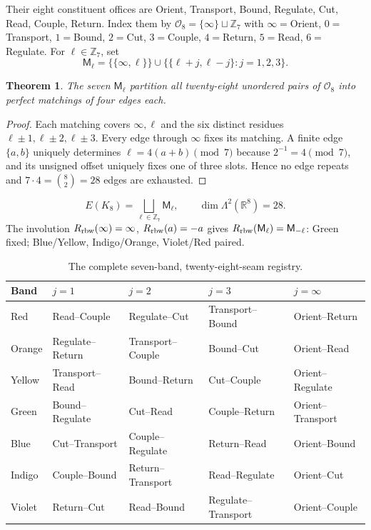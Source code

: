 \documentclass[10pt]{article}
\newtheorem{theorem}{Theorem}
\newcommand{\R}{\mathbb R}
\newcommand{\Z}{\mathbb Z}
\begin{document}
Their eight constituent offices are Orient, Transport, Bound, Regulate, Cut, Read, Couple, Return. Index them by $\mathcal O_8=\{\infty\}\sqcup\Z_7$ with $\infty=$Orient, $0=$Transport, $1=$Bound, $2=$Cut, $3=$Couple, $4=$Return, $5=$Read, $6=$Regulate. For $\ell\in\Z_7$, set
\begin{equation}\mathsf M_\ell=\{\{\infty,\ell\}\}\cup\{\{\ell+j,\ell-j\}:j=1,2,3\}.\end{equation}
\begin{theorem}The seven $\mathsf M_\ell$ partition all twenty-eight unordered pairs of $\mathcal O_8$ into perfect matchings of four edges each.\end{theorem}
\begin{proof}Each matching covers $\infty,\ell$ and the six distinct residues $\ell\pm1,\ell\pm2,\ell\pm3$. Every edge through $\infty$ fixes its matching. A finite edge $\{a,b\}$ uniquely determines $\ell=4(a+b)\pmod7$ because $2^{-1}=4\pmod7$, and its unsigned offset uniquely fixes one of three slots. Hence no edge repeats and $7\cdot4=\binom82=28$ edges are exhausted.\end{proof}
\begin{equation}\boxed{E(K_8)=\bigsqcup_{\ell\in\Z_7}\mathsf M_\ell,\qquad\dim\Lambda^2(\R^8)=28.}\end{equation}
The involution $R_{\rm rbw}(\infty)=\infty$, $R_{\rm rbw}(a)=-a$ gives $R_{\rm rbw}(\mathsf M_\ell)=\mathsf M_{-\ell}$: Green fixed; Blue/Yellow, Indigo/Orange, Violet/Red paired.
\begin{table}[ht]\centering\scriptsize\begin{tabular}{@{}lllll@{}}\toprule Band&$j=1$&$j=2$&$j=3$&$j=\infty$\\ \midrule
Red&Read--Couple&Regulate--Cut&Transport--Bound&Orient--Return\\
Orange&Regulate--Return&Transport--Couple&Bound--Cut&Orient--Read\\
Yellow&Transport--Read&Bound--Return&Cut--Couple&Orient--Regulate\\
Green&Bound--Regulate&Cut--Read&Couple--Return&Orient--Transport\\
Blue&Cut--Transport&Couple--Regulate&Return--Read&Orient--Bound\\
Indigo&Couple--Bound&Return--Transport&Read--Regulate&Orient--Cut\\
Violet&Return--Cut&Read--Bound&Regulate--Transport&Orient--Couple\\ \bottomrule\end{tabular}\caption{The complete seven-band, twenty-eight-seam registry.}\end{table}
\end{document}
